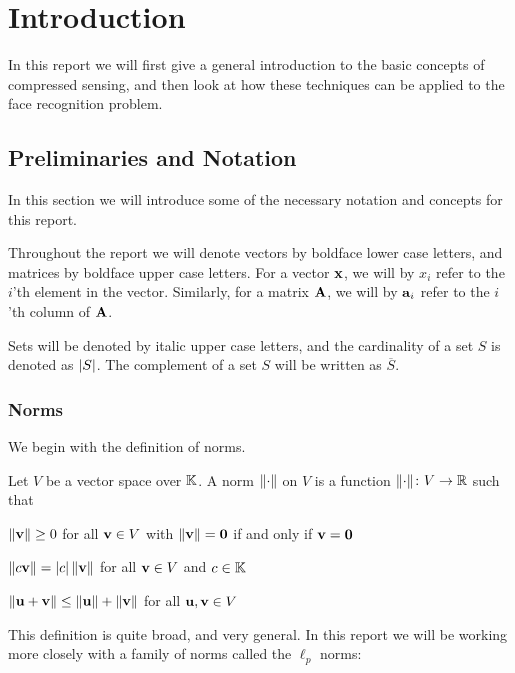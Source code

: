 \chapter{Introduction}
\lipsum[2]

In this report we will first give a general introduction to the basic concepts of compressed sensing, and then look at how these techniques can be applied to the face recognition problem. 


\section{Preliminaries and Notation}
In this section we will introduce some of the necessary notation and concepts for this report. 

Throughout the report we will denote vectors by boldface lower case letters, and matrices by boldface upper case letters. For a vector $ \mathbf{x} $, we will by $ x_{i} $ refer to the $ i $'th element in the vector. Similarly, for a matrix $ \mathbf{A} $, we will by $ \mathbf{a}_{i} $ refer to the $ i $'th  column of $ \mathbf{A} $. 

Sets will be denoted by italic upper case letters, and the cardinality of a set $ S $ is denoted as $ \left|S\right| $. The complement of a set $ S $ will be written as $ \overline{S} $. 

\subsection{Norms}
We begin with the definition of norms. 

\begin{definition} \label{def:norm}
	Let $ V $ be a vector space over $ \mathbb{K} $.  A norm $ \lVert\cdot\rVert $ on $ V $ is a function $ \lVert\cdot\rVert\colon V \to\mathbb{R} $ such that
	\begin{subdef}
		\item $ \lVert\mathbf{v}\rVert \geq 0 $ for all $ \mathbf{v} \in V $ with $ \lVert\mathbf{v}\rVert = \mathbf{0} $ if and only if $ \mathbf{v} = \mathbf{0} $
		\item $ \lVert c\mathbf{v}\rVert = \left|c\right|\lVert\mathbf{v}\rVert $ for all $ \mathbf{v} \in V $ and $ c \in \mathbb{K} $
		\item $ \lVert\mathbf{u} + \mathbf{v}\rVert \leq \lVert\mathbf{u}\rVert + \lVert\mathbf{v}\rVert $ for all $ \mathbf{u},  \mathbf{v} \in V $
	\end{subdef}
\end{definition}

This definition is quite broad, and very general. In this report we will be working more closely with a family of norms called the $ \ell_{p} $ norms:

